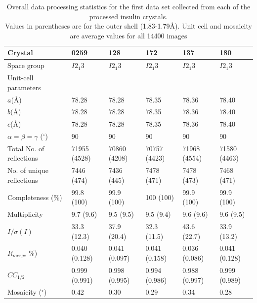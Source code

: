 \begin{table}[ht!]
\centering
\captionsetup{justification=centering}
	\caption{Overall data processing statistics for the first data set collected from each of the processed insulin crystals.
	\\[1pt]
	Values in parentheses are for the outer shell (1.83-1.79\AA). Unit cell and mosaicity are average values for all 14400 images}
	\centering
	\begin{tabular}{p{3.5cm} p{2cm} p{2cm} p{2cm} p{2cm} p{2cm}}
		\hline
		Crystal  																	&0259				   &128						&172					 &137						&180						\\
		\hline
		Space group   														&$I2_{1}3$		 &$I2_{1}3$			&$I2_{1}3$	   &$I2_{1}3$			&$I2_{1}3$	 		\\
		Unit-cell parameters  										& 						 &    					&   					 &   						&  						 	\\
		$a$(\AA)  																&78.28				 &78.28					&78.35				 &78.36 				&78.40					\\
		$b$(\AA)  																&78.28				 &78.28					&78.35				 &78.36					&78.40					\\
		$c$(\AA)  																&78.28				 &78.28					&78.35				 &78.36				  &78.40					\\
		$\alpha = \beta = \gamma$ ($^{\circ}$) 		&90					   &90 						&90						 &90					 	&90							\\
		Total No. of reflections									&71955 (4528)  &70860 (4208)	&70757 (4423)	 &71968 (4554)	&71580 (4463)		\\
		No. of unique reflections									&7446 (474)	   &7436 (445)		&7478 (471)		 &7478 (473)		&7468 (471)			\\
		Completeness ($\%$) 											&99.8 (100)	   &99.9 (100)		&100 (100)		 &99.9 (100)		&99.9 (100) 		\\
		Multiplicity															&9.7 (9.6)		 &9.5 (9.5)			&9.5 (9.4)		 &9.6 (9.6)		  &9.6 (9.5)			\\
		$I/\sigma (I)$												 		&33.3 (12.3)	 &37.9 (20.4)		&32.3	 (11.5)	 &43.6 (22.7)	  &33.9 (13.2)  	\\
		$R_{merge}$ $\%$)													&0.040 (0.128) &0.041 (0.097) &0.041 (0.158) &0.036 (0.086) &0.041 (0.128)  \\
		$CC_{1/2}$																&0.999 (0.991) &0.998 (0.995) &0.994 (0.986) &0.988 (0.997) &0.999 (0.989)	\\
		Mosaicity ($^{\circ}$)										&0.42				   &0.30					&0.29					 &0.34					&0.28						\\
		\hline
	\end{tabular}
	\label{tab: Hamburg data processing}
\end{table}

